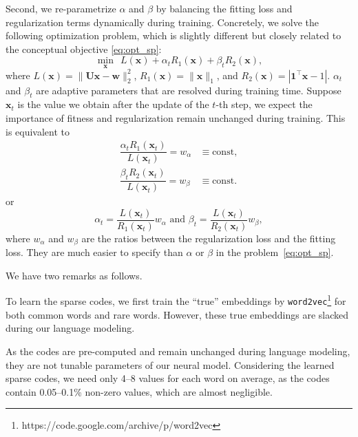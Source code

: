 \documentclass[11pt]{article}
\renewcommand{\vector}[1]{\bm{#1}}
\newcommand{\trans}[1]{#1^{\top}}
\begin{document}
Second, we re-parametrize  $\alpha$ and $\beta$ by balancing the fitting loss and regularization terms dynamically during training.
Concretely, we solve the following optimization problem, which is
slightly different but closely related to the conceptual objective \eqref{eq:opt_sp}:
\begin{equation}\label{eq:opt_sp_trick}
    \min_{\vector{x}}\ \ L(\vector{x}) + \alpha_t R_1(\vector{x}) + \beta_t R_2(\vector{x}),
\end{equation}
where $L(\vector{x}) = \| \vector{Ux} - \vector{w} \|_{2}^{2}$, $R_1(\vector{x}) = \|\vector{x}\|_1$,
and $R_2(\vector{x}) = |\trans{\vector{1}} \vector{x} - 1|$. $\alpha_t$ and $\beta_t$ are
adaptive parameters that are resolved during training time.
Suppose $\vector{x}_t$ is the value we obtain after the update of the $t$-th step,
we expect the importance of fitness and regularization remain unchanged during training.
This is equivalent to
\begin{align}
\dfrac{\alpha_t R_1(\vector{x}_t)}{L(\vector{x}_t)} = w_\alpha &\equiv \mbox{const}, \label{eq:alpha}\\
\dfrac{\beta_t R_2(\vector{x}_t)}{L(\vector{x}_t)} = w_\beta &\equiv \mbox{const}. \label{eq:beta}
\end{align}
or
\[
\alpha_t = \dfrac{L(\vector{x}_t)}{R_1(\vector{x}_t)} w_\alpha \text{ and }
\beta_t = \dfrac{L(\vector{x}_t)}{R_2(\vector{x}_t)} w_\beta,
\]
where $w_\alpha$ and $w_\beta$  are the ratios between the regularization loss and
the fitting loss. They are much easier to specify than $\alpha$ or $\beta$ in the problem~\eqref{eq:opt_sp}.

We have two remarks as follows.
\begin{compactitem}
\item To learn the sparse codes, we first train the ``true'' embeddings by {\tt word2vec}\footnote{https://code.google.com/archive/p/word2vec}  for both common words and rare words. However, these true embeddings are slacked during our language modeling.
\item As the codes are pre-computed and remain unchanged during language modeling, they are not tunable parameters of our neural model. Considering the learned sparse codes, we need only 4--8 values for each word on average, as the codes contain 0.05--0.1\% non-zero values, which are almost negligible.
\end{compactitem}
\end{document}
